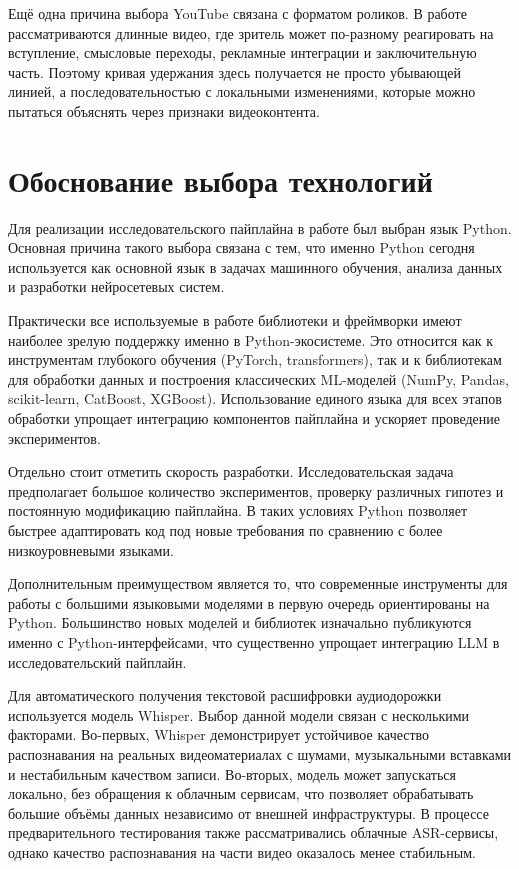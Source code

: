\documentclass[times]{itmo-student-thesis}
\begin{document}
Ещё одна причина выбора YouTube связана с форматом роликов. В работе рассматриваются длинные видео, где зритель может по-разному реагировать на вступление, смысловые переходы, рекламные интеграции и заключительную часть. Поэтому кривая удержания здесь получается не просто убывающей линией, а последовательностью с локальными изменениями, которые можно пытаться объяснять через признаки видеоконтента.

\section{Обоснование выбора технологий}

Для реализации исследовательского пайплайна в работе был выбран язык Python. Основная причина такого выбора связана с тем, что именно Python сегодня используется как основной язык в задачах машинного обучения, анализа данных и разработки нейросетевых систем.

Практически все используемые в работе библиотеки и фреймворки имеют наиболее зрелую поддержку именно в Python-экосистеме. Это относится как к инструментам глубокого обучения (PyTorch, transformers), так и к библиотекам для обработки данных и построения классических ML-моделей (NumPy, Pandas, scikit-learn, CatBoost, XGBoost). Использование единого языка для всех этапов обработки упрощает интеграцию компонентов пайплайна и ускоряет проведение экспериментов.

Отдельно стоит отметить скорость разработки. Исследовательская задача предполагает большое количество экспериментов, проверку различных гипотез и постоянную модификацию пайплайна. В таких условиях Python позволяет быстрее адаптировать код под новые требования по сравнению с более низкоуровневыми языками.

Дополнительным преимуществом является то, что современные инструменты для работы с большими языковыми моделями в первую очередь ориентированы на Python. Большинство новых моделей и библиотек изначально публикуются именно с Python-интерфейсами, что существенно упрощает интеграцию LLM в исследовательский пайплайн.

Для автоматического получения текстовой расшифровки аудиодорожки используется модель Whisper. Выбор данной модели связан с несколькими факторами. Во-первых, Whisper демонстрирует устойчивое качество распознавания на реальных видеоматериалах с шумами, музыкальными вставками и нестабильным качеством записи. Во-вторых, модель может запускаться локально, без обращения к облачным сервисам, что позволяет обрабатывать большие объёмы данных независимо от внешней инфраструктуры. В процессе предварительного тестирования также рассматривались облачные ASR-сервисы, однако качество распознавания на части видео оказалось менее стабильным.
\end{document}
